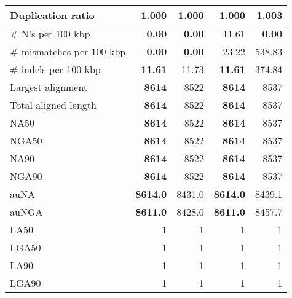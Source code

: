\documentclass[12pt,a4paper]{article}
\begin{document}
\begin{table}[ht]
\begin{center}
\begin{tabular}{|l*{4}{|r}|}
Duplication ratio & {\bf 1.000} & {\bf 1.000} & {\bf 1.000} & 1.003 \\ \hline
\# N's per 100 kbp & {\bf 0.00} & {\bf 0.00} & 11.61 & {\bf 0.00} \\ \hline
\# mismatches per 100 kbp & {\bf 0.00} & {\bf 0.00} & 23.22 & 538.83 \\ \hline
\# indels per 100 kbp & {\bf 11.61} & 11.73 & {\bf 11.61} & 374.84 \\ \hline
Largest alignment & {\bf 8614} & 8522 & {\bf 8614} & 8537 \\ \hline
Total aligned length & {\bf 8614} & 8522 & {\bf 8614} & 8537 \\ \hline
NA50 & {\bf 8614} & 8522 & {\bf 8614} & 8537 \\ \hline
NGA50 & {\bf 8614} & 8522 & {\bf 8614} & 8537 \\ \hline
NA90 & {\bf 8614} & 8522 & {\bf 8614} & 8537 \\ \hline
NGA90 & {\bf 8614} & 8522 & {\bf 8614} & 8537 \\ \hline
auNA & {\bf 8614.0} & 8431.0 & {\bf 8614.0} & 8439.1 \\ \hline
auNGA & {\bf 8611.0} & 8428.0 & {\bf 8611.0} & 8457.7 \\ \hline
LA50 & 1 & 1 & 1 & 1 \\ \hline
LGA50 & 1 & 1 & 1 & 1 \\ \hline
LA90 & 1 & 1 & 1 & 1 \\ \hline
LGA90 & 1 & 1 & 1 & 1 \\ \hline
\end{tabular}
\end{center}
\end{table}
\end{document}
